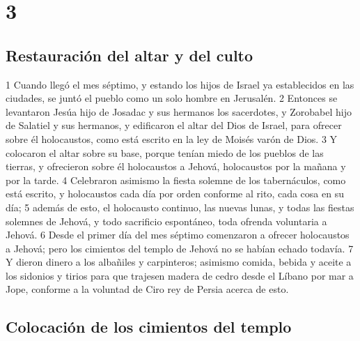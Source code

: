 \chapter{3}

\section*{Restauración del altar y del culto}

1 Cuando llegó el mes séptimo, y estando los hijos de Israel ya establecidos en las ciudades, se juntó el pueblo como un solo hombre en Jerusalén.
2 Entonces se levantaron Jesúa hijo de Josadac y sus hermanos los sacerdotes, y Zorobabel hijo de Salatiel y sus hermanos, y edificaron el altar del Dios de Israel, para ofrecer sobre él holocaustos, como está escrito en la ley de Moisés varón de Dios.
3 Y colocaron el altar sobre su base, porque tenían miedo de los pueblos de las tierras, y ofrecieron sobre él holocaustos a Jehová, holocaustos por la mañana y por la tarde. 
4 Celebraron asimismo la fiesta solemne de los tabernáculos, como está escrito, y holocaustos cada día por orden conforme al rito, cada cosa en su día;
5 además de esto, el holocausto continuo, las nuevas lunas, y todas las fiestas solemnes de Jehová, y todo sacrificio espontáneo, toda ofrenda voluntaria a Jehová.
6 Desde el primer día del mes séptimo comenzaron a ofrecer holocaustos a Jehová; pero los cimientos del templo de Jehová no se habían echado todavía.
7 Y dieron dinero a los albañiles y carpinteros; asimismo comida, bebida y aceite a los sidonios y tirios para que trajesen madera de cedro desde el Líbano por mar a Jope, conforme a la voluntad de Ciro rey de Persia acerca de esto.

\section*{Colocación de los cimientos del templo}


